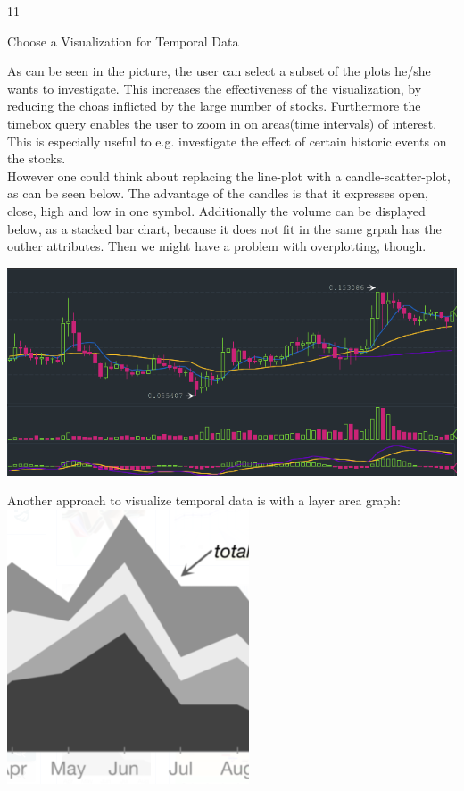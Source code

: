 \documentclass{article}
\begin{document}
\begin{ukon-infie}[31.01.18]{11}
\begin{exercise}[p=7]{Choose a Visualization for Temporal Data}
{						As can be seen in the picture, the user can select a subset of the plots he/she wants to investigate. This increases the effectiveness of the visualization, by reducing the choas inflicted by the large number of stocks. Furthermore the timebox query enables the user to zoom in on areas(time intervals) of interest. This is especially useful to e.g. investigate the effect of certain historic events on the stocks.\\

			
			However one could think about replacing the line-plot with a candle-scatter-plot, as can be seen below. The advantage of the candles is that it expresses open, close, high and low in one symbol. Additionally the volume can be displayed below, as a stacked bar chart, because it does not fit in the same grpah has the outher attributes. Then we might have a problem with overplotting, though.
			
						\includegraphics[scale=0.7]{candles.png}

			
			Another approach to visualize temporal data is with a layer area graph:\\
			
			\includegraphics[scale=0.7]{layered_area_graph.png}
			
}
\end{exercise}
\end{ukon-infie}
\end{document}

